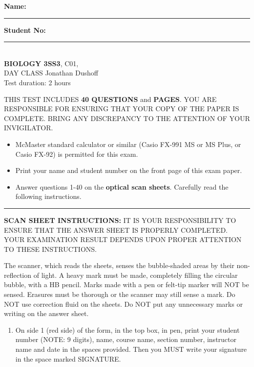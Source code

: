 

\textbf{Name:} \rule{5cm}{1pt} \hfill \textbf{Student No:} \rule{5cm}{1pt} \\

\bigskip\noindent \hfill {\large {\bf BIOLOGY 3SS3}, C01,
	\testver
} \hspace*{\fill} \\
DAY CLASS  \hfill Jonathan Dushoff \\
Test duration: 2 hours \hfill \term

{\small

\medskip\noindent THIS TEST INCLUDES {\bf 40 QUESTIONS} and \textbf{\pageref{LastPage} PAGES}. YOU ARE RESPONSIBLE FOR ENSURING THAT YOUR COPY OF THE PAPER IS COMPLETE. BRING ANY DISCREPANCY TO THE ATTENTION OF YOUR INVIGILATOR. 

\begin{itemize}
\item McMaster standard calculator or similar (Casio FX-991 MS or MS Plus, or Casio FX-92) is permitted for this exam.
\item Print your name and student number on the front page of this exam paper.
\item Answer questions 1-40 on the \textbf{optical scan sheets}.  Carefully read the following instructions.
\end{itemize}
\hrule
\bigskip\textbf{SCAN SHEET INSTRUCTIONS:} 
IT IS YOUR RESPONSIBILITY TO ENSURE THAT THE ANSWER SHEET IS PROPERLY COMPLETED. YOUR EXAMINATION RESULT DEPENDS UPON PROPER ATTENTION TO THESE INSTRUCTIONS.

The scanner, which reads the sheets, senses the bubble-shaded areas by their non-reflection of light.  A heavy mark must be made, completely filling the circular bubble, with a HB pencil.  Marks made with a pen or felt-tip marker will NOT be sensed.  Erasures must be thorough or the scanner may still sense a mark.  Do NOT use correction fluid on the sheets.  Do NOT put any unnecessary marks or writing on the answer sheet.

\begin{enumerate}

\item On side 1 (red side) of the form, in the top box, in pen, print your student number (NOTE: 9 digits), name, course name, section number, instructor name and date in the spaces provided.  Then you MUST write your signature in the space marked SIGNATURE.


\end{enumerate}}
